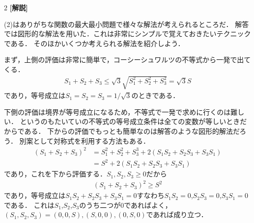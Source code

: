 \documentclass[../../main.tex]{subfiles}
\begin{document}
\begin{multicols}{2}
  \vspace{10pt}
  {\bf[解説]}

  (2)はありがちな関数の最大最小問題で様々な解法が考えられるところだ．
  解答では図形的な解法を用いた．これは非常にシンプルで覚えておきたいテクニックである．
  そのほかいくつか考えられる解法を紹介しよう．

  まず，上側の評価は非常に簡単で，コーシーシュワルツの不等式から一発で出てくる．
  \begin{align*}
    S_1+S_2+S_3 \le \sqrt{3}\sqrt{S_1^2+S_2^2+S_3^2} = \sqrt{3}S
  \end{align*}
  であり，等号成立は$S_1=S_2=S_3=1/\sqrt{3}$のときである．

  下側の評価は境界が等号成立になるため，不等式で一発で求めに行くのは難しい．
  というのもたいていの不等式の等号成立条件は全ての変数が等しいときだからである．
  下からの評価でもっとも簡単なのは解答のような図形的解法だろう．
  別案として対称式を利用する方法もある．
  \begin{align*}
    (S_1+S_2+S_3)^2
     & = S_1^2+S_2^2+S_3^3 + 2(S_1S_2+S_2S_3+S_3S_1) \\
     & = S^2 + 2(S_1S_2+S_2S_3+S_3S_1)
  \end{align*}
  であり，これを下から評価する．$S_1,S_2,S_3\ge 0$だから
  \begin{align*}
    (S_1+S_2+S_3)^2 \ge S^2
  \end{align*}
  であり，等号成立は$S_1S_2+S_2S_3+S_3S_1=0$すなわち$S_1S_2=0$,$S_2S_3=0$,$S_3S_1=0$である．
  これは$S_1$,$S_2$,$S_3$のうち二つが$0$であればよく，$(S_1,S_2,S_3)=(0,0,S),(S,0,0),(0,S,0)$であれば成り立つ．


\end{multicols}
\end{document}

